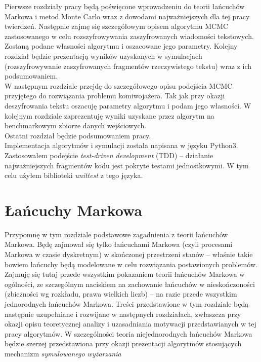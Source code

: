 \documentclass[a4paper]{article}
\begin{document}
Pierwsze rozdziały pracy będą poświęcone wprowadzeniu do teorii łańcuchów Markowa i metod Monte Carlo wraz z dowodami najważniejszych dla tej pracy twierdzeń. Następnie zajmę się szczegółowym opisem algorytmu MCMC zastosowanego w celu rozszyfrowywania zaszyfrowanych wiadomości tekstowych. Zostaną podane własności algorytmu i oszacowane jego parametry. Kolejny rozdział będzie prezentacją wyników uzyskanych w symulacjach (rozszyfrowywanie zaszyfrowanych fragmentów rzeczywistego tekstu) wraz z ich podsumowaniem. \\
W następnym rozdziale przejdę do szczegółowego opisu podejścia MCMC przyjętego do rozwiązania problemu komiwojażera. Tak jak przy okazji deszyfrowania tekstu oszacuję parametry algorytmu i podam jego własności. W kolejnym rozdziale zaprezentuję wyniki uzyskane przez algorytm na benchmarkowym zbiorze danych wejściowych.\\
Ostatni rozdział będzie podsumowaniem pracy.\\

Implementacja algorytmów i symulacji została napisana w języku Python3. Zastosowałem podejście \textit{test-driven development} (TDD) – działanie najważniejszych fragmentów kodu jest pokryte testami jednostkowymi. W tym celu użyłem biblioteki \textit{unittest} z tego języka.

\newpage

\section{Łańcuchy Markowa}
Przypomnę w tym rozdziale podstawowe zagadnienia z teorii łańcuchów Markowa. Będę zajmował się tylko łańcuchami Markowa (czyli procesami Markowa w czasie dyskretnym) w skończonej przestrzeni stanów – właśnie takie bowiem łańcuchy będą modelowane w celu rozwiązania postawionych problemów. Zajmuję się tutaj przede wszystkim pokazaniem teorii łańcuchów Markowa w ogólności, ze szczególnym naciskiem na zachowanie łańcuchów w nieskończoności (zbieżności wg rozkładu, prawa wielkich liczb) – na razie przede wszystkim jednorodnych łańcuchów Markowa. Treści przedstawione w tym rozdziale będą następnie uzupełniane i rozwijane w następnych rozdziałach, zwłaszcza przy okazji opisu teoretycznej analizy i uzasadniania motywacji przedstawianych w tej pracy algorytmów. W szczególności teoria niejednorodnych łańcuchów Markowa będzie szerzej przedstawiona przy okazji prezentacji algorytmów stosujących mechanizm \textit{symulowanego wyżarzania}\\ 
\end{document}

